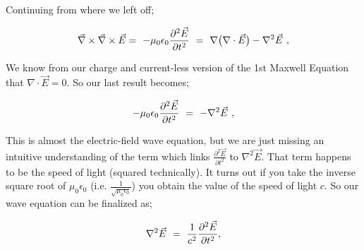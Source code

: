 \documentclass{article}
\begin{document}
Continuing from where we left off;

\begin{equation} \label{eb-eq-1002-5}
\vec{\nabla}\times\vec{\nabla}\times\vec{E} = \hspace{0.125cm} -\mu_{0}\epsilon_{0}\frac{\partial^{2}{\vec{E}}}{\partial{t}^{2}} \hspace{0.125cm} = \hspace{0.125cm} \nabla\big(\nabla\cdot\vec{E}\big) - \nabla^{2}\vec{E} \hspace{0.125cm} ,
\end{equation}

We know from our charge and current-less version of the 1st Maxwell Equation that \begin{math} \nabla\cdot\vec{E} = 0 \end{math}. So our last result becomes;

\begin{equation} \label{eb-eq-1002-6}
-\mu_{0}\epsilon_{0}\frac{\partial^{2}{\vec{E}}}{\partial{t}^{2}} \hspace{0.125cm} = \hspace{0.125cm} -\nabla^{2}\vec{E} \hspace{0.125cm} ,
\end{equation}

This is almost the electric-field wave equation, but we are just missing an intuitive understanding of the term which links \begin{math} \frac{\partial^{2}{\vec{E}}}{\partial{t}^{2}} \end{math} to \begin{math} \nabla^{2}\vec{E} \end{math}. That term happens to be the speed of light (squared technically). It turns out if you take the inverse square root of \begin{math} \mu_{0}\epsilon_{0} \end{math} (i.e. \begin{math} \frac{1}{\sqrt{\mu_{0}\epsilon_{0}}} \end{math}) you obtain the value of the speed of light \begin{math} c \end{math}. So our wave equation can be finalized as;

\begin{equation} \label{eb-eq-1002-7}
\nabla^{2}\vec{E} \hspace{0.125cm} = \hspace{0.125cm}   \frac{1}{c^2} \frac{\partial^{2}{\vec{E}}}{\partial{t}^{2}} ,
\end{equation}
\end{document}
